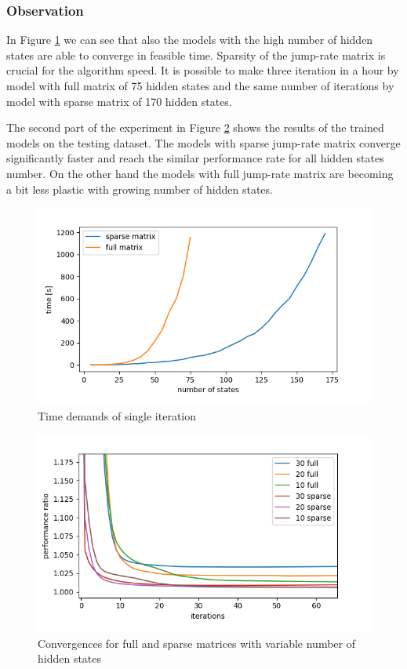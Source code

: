 \documentclass[thesis=M,english]{FITthesis}[2012/10/20]
\begin{document}
\subsubsection*{ Observation }

In Figure \ref{fig:time} we can see that also the models with the high number of hidden states are able to converge in feasible time. Sparsity of the jump-rate matrix is crucial for the algorithm speed. It is possible to make three iteration in a hour by model with full matrix of 75 hidden states and the same number of iterations by model with sparse matrix of 170 hidden states.   

The second part of the experiment in Figure \ref{fig:big} shows the results of the trained models on the testing dataset. The models with sparse jump-rate matrix converge significantly faster and reach the similar performance rate for all hidden states number. On the other hand the models with full jump-rate matrix are becoming a bit less plastic with growing number of hidden states.

\begin{figure}
\centering
\includegraphics[width=1\linewidth]{img/ex5.2/time.png}
\caption{Time demands of single iteration }
\label{fig:time}
\end{figure}


\begin{figure}
\centering
\includegraphics[width=1\linewidth]{img/ex5.3/big.png}
\caption{Convergences for full and sparse matrices with variable number of hidden states}
\label{fig:big}
\end{figure}
\end{document}
